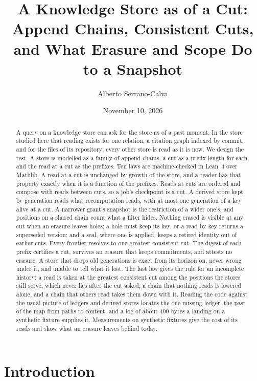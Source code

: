 \documentclass[11pt]{article}
\title{A Knowledge Store as of a Cut:\\
Append Chains, Consistent Cuts, and What Erasure and Scope Do to a Snapshot}
\author{Alberto Serrano-Calva}
\date{November 10, 2026}
\theoremstyle{plain}
\theoremstyle{definition}
\begin{document}
\maketitle

\begin{abstract}
A query on a knowledge store can ask for the store as of a past moment. In the store studied here
that reading exists for one relation, a citation graph indexed by commit, and for the files of
its repository; every other store is read as it is now. We design the rest. A store is modelled as a family of append chains, a cut as a
prefix length for each, and the read at a cut as the prefixes. Ten laws are machine-checked in
Lean~4 over Mathlib. A read at a cut is unchanged by growth of the store, and a reader has that
property exactly when it is a function of the prefixes. Reads at cuts are ordered and compose with
reads between cuts, so a job's checkpoint is a cut. A derived store kept by generation reads what
recomputation reads, with at most one generation of a key alive at a cut. A narrower grant's
snapshot is the restriction of a wider one's, and positions on a shared chain count what a filter
hides. Nothing erased is visible at any cut when an erasure leaves holes; a hole must keep its
key, or a read by key returns a superseded version; and a seal, where one is applied, keeps a
retired identity out of earlier cuts. Every frontier resolves to one greatest consistent cut. The
digest of each prefix certifies a cut, survives an erasure that keeps commitments, and attests
no erasure. A store that drops old generations is exact from its horizon on, never wrong under
it, and unable to tell what it lost. The last law gives the rule for an incomplete history: a
read is taken at the greatest consistent cut among the positions the stores still serve, which
never lies after the cut asked; a chain that nothing reads is lowered alone, and a chain that
others read takes them down with it. Reading the code against the usual picture of ledgers and
derived stores locates the one missing ledger, the past of the map from paths to content, and a
log of about 400 bytes a landing on a synthetic fixture supplies it. Measurements on synthetic
fixtures give the cost of its reads and show what an erasure leaves behind today.
\end{abstract}

\section{Introduction}
\end{document}
